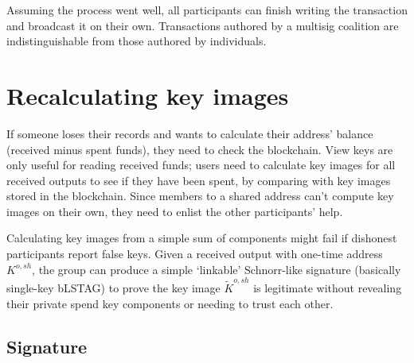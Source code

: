 Assuming the process went well, all participants can finish writing the transaction and broadcast it on their own. Transactions authored by a multisig coalition are indistinguishable from those authored by individuals.



\section{Recalculating key images}
\label{sec:recalculating-key-images-multisig}

If someone loses their records and wants to calculate their address' balance (received minus spent funds), they need to check the blockchain. View keys are only useful for reading received funds; users need to calculate key images for all received outputs to see if they have been spent, by comparing with key images stored in the blockchain. Since members to a shared address can't compute key images on their own, they need to enlist the other participants' help.

Calculating key images from a simple sum of components might fail if dishonest participants report false keys. Given a received output with one-time address $K^{o,sh}$, the group can produce a simple `linkable' Schnorr-like signature (basically single-key bLSTAG) to prove the key image $\tilde{K}^{o,sh}$ is legitimate without revealing their private spend key components or needing to trust each other. 

\subsection*{Signature}

